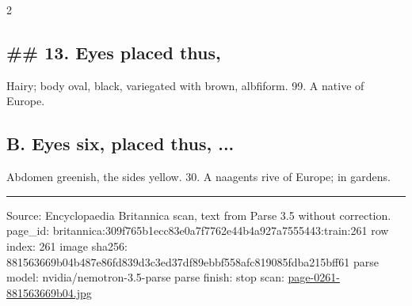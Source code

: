 \documentclass[10pt]{article}
\begin{document}
\begin{multicols}{2}
\subsection*{\#\# 13. Eyes placed thus,}
Hairy; body oval, black, variegated with brown, albfiform. 99. A native of Europe.

\subsection*{B. Eyes six, placed thus, ...}
Abdomen greenish, the sides yellow. 30. A naagents rive of Europe; in gardens.

\end{multicols}
\vfill\par\noindent\rule{\linewidth}{0.4pt}\par
{\scriptsize\color{gray}\noindent Source: Encyclopaedia Britannica scan, text from Parse 3.5 without correction. page\_id: britannica:309f765b1ecc83e0a7f7762e44b4a927a7555443:train:261 \quad row index: 261 \quad image sha256: 881563669b04b487e86fd839d3c3ed37df89ebbf558afc819085fdba215bff61 \quad parse model: nvidia/nemotron-3.5-parse \quad parse finish: stop \quad scan: \href{../scans/page-0261-881563669b04.jpg}{page-0261-881563669b04.jpg}\par}
\end{document}
